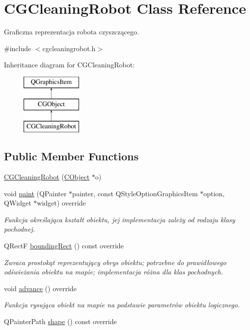 \hypertarget{class_c_g_cleaning_robot}{}\section{C\+G\+Cleaning\+Robot Class Reference}
\label{class_c_g_cleaning_robot}


Graficzna reprezentacja robota czyszczącego.  




{\ttfamily \#include $<$cgcleaningrobot.\+h$>$}

Inheritance diagram for C\+G\+Cleaning\+Robot\+:\begin{figure}[H]
\begin{center}
\leavevmode
\includegraphics[height=3.000000cm]{class_c_g_cleaning_robot}
\end{center}
\end{figure}
\subsection*{Public Member Functions}
\begin{DoxyCompactItemize}
\item 
\mbox{\hyperlink{class_c_g_cleaning_robot_a5160e7e9a94c95ca091fab0375b8c414}{C\+G\+Cleaning\+Robot}} (\mbox{\hyperlink{class_c_object}{C\+Object}} $\ast$o)
\item 
void \mbox{\hyperlink{class_c_g_cleaning_robot_ad5c738dfd5633e0a4165309dd26033f5}{paint}} (Q\+Painter $\ast$painter, const Q\+Style\+Option\+Graphics\+Item $\ast$option, Q\+Widget $\ast$widget) override
\begin{DoxyCompactList}\small\item\em Funkcja określająca kształt obiektu, jej implementacja zależy od rodzaju klasy pochodnej. \end{DoxyCompactList}\item 
Q\+RectF \mbox{\hyperlink{class_c_g_cleaning_robot_a6fe8401e3b604cf5c3e449a56bb5655c}{bounding\+Rect}} () const override
\begin{DoxyCompactList}\small\item\em Zwraca prostokąt reprezentujący obrys obiektu; potrzebne do prawidłowego odświeżania obiektu na mapie; implementacja różna dla klas pochodnych. \end{DoxyCompactList}\item 
void \mbox{\hyperlink{class_c_g_cleaning_robot_a96511d40b48a6ac5a2fa31f2ed1f24e7}{advance}} () override
\begin{DoxyCompactList}\small\item\em Funkcja rysująca obiekt na mapie na podstawie parametrów obiektu logicznego. \end{DoxyCompactList}\item 
Q\+Painter\+Path \mbox{\hyperlink{class_c_g_cleaning_robot_a6ce1fefa61f2ffab1ec6c2ed2dad9ebe}{shape}} () const override
\end{DoxyCompactItemize}
